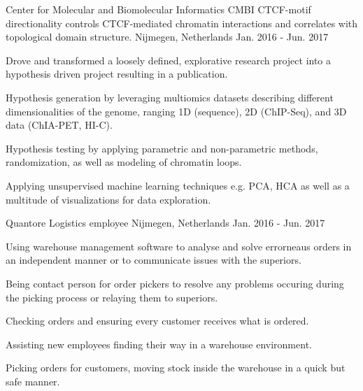 \begin{cventries}
  \cventry
    {Center for Molecular and Biomolecular Informatics CMBI} %
    {CTCF-motif directionality controls CTCF-mediated chromatin interactions
    and correlates with topological domain structure.} %
    {Nijmegen, Netherlands} %
    {Jan. 2016 - Jun. 2017} %
    {
      \begin{cvitems} %
        \item {Drove and transformed a loosely defined, explorative research project into a hypothesis driven project resulting in a publication.}
        \item {Hypothesis generation by leveraging multiomics datasets describing different dimensionalities of the genome, ranging 1D (sequence), 2D (ChIP-Seq), and 3D data (ChIA-PET, HI-C).}
        \item {Hypothesis testing by applying parametric and non-parametric methods, randomization, as well as modeling of chromatin loops.}
        \item {Applying unsupervised machine learning techniques e.g. PCA, HCA as well as a multitude of visualizations for data exploration.}
      \end{cvitems}
    }
\cventry
    {Quantore} %
    {Logistics employee} %
    {Nijmegen, Netherlands} %
    {Jan. 2016 - Jun. 2017} %
    {
      \begin{cvitems}
        \item {Using warehouse management software to analyse and solve errorneaus orders in an independent manner or to communicate issues with the superiors.}
        \item {Being contact person for order pickers to resolve any problems occuring during the picking process or relaying them to superiors.}
        \item {Checking orders and ensuring every customer receives what is ordered.}
        \item {Assisting new employees finding their way in a warehouse environment.}
        \item {Picking orders for customers, moving stock inside the warehouse in a quick but safe manner.}
      \end{cvitems}
    }
\end{cventries}
